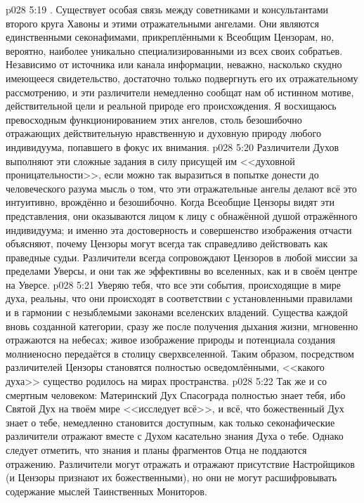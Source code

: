 \vs p028 5:19 . Существует особая связь между советниками и консультантами второго круга Хавоны и этими отражательными ангелами. Они являются единственными секонафимами, прикреплёнными к Всеобщим Цензорам, но, вероятно, наиболее уникально специализированными из всех своих собратьев. Независимо от источника или канала информации, неважно, насколько скудно имеющееся свидетельство, достаточно только подвергнуть его их отражательному рассмотрению, и эти различители немедленно сообщат нам об истинном мотиве, действительной цели и реальной природе его происхождения. Я восхищаюсь превосходным функционированием этих ангелов, столь безошибочно отражающих действительную нравственную и духовную природу любого индивидуума, попавшего в фокус их внимания.
\vs p028 5:20 Различители Духов выполняют эти сложные задания в силу присущей им <<духовной проницательности>>, если можно так выразиться в попытке донести до человеческого разума мысль о том, что эти отражательные ангелы делают всё это интуитивно, врождённо и безошибочно. Когда Всеобщие Цензоры видят эти представления, они оказываются лицом к лицу с обнажённой душой отражённого индивидуума; и именно эта достоверность и совершенство изображения отчасти объясняют, почему Цензоры могут всегда так справедливо действовать как праведные судьи. Различители всегда сопровождают Цензоров в любой миссии за пределами Уверсы, и они так же эффективны во вселенных, как и в своём центре на Уверсе.
\vs p028 5:21 Уверяю тебя, что все эти события, происходящие в мире духа, реальны, что они происходят в соответствии с установленными правилами и в гармонии с незыблемыми законами вселенских владений. Существа каждой вновь созданной категории, сразу же после получения дыхания жизни, мгновенно отражаются на небесах; живое изображение природы и потенциала создания молниеносно передаётся в столицу сверхвселенной. Таким образом, посредством различителей Цензоры становятся полностью осведомлёнными, <<какого духа>> существо родилось на мирах пространства.
\vs p028 5:22 Так же и со смертным человеком: Материнский Дух Спасограда полностью знает тебя, ибо Святой Дух на твоём мире <<исследует всё>>, и всё, что божественный Дух знает о тебе, немедленно становится доступным, как только секонафические различители отражают вместе с Духом касательно знания Духа о тебе. Однако следует отметить, что знания и планы фрагментов Отца не поддаются отражению. Различители могут отражать и отражают присутствие Настройщиков (и Цензоры признают их божественными), но они не могут расшифровывать содержание мыслей Таинственных Мониторов.
